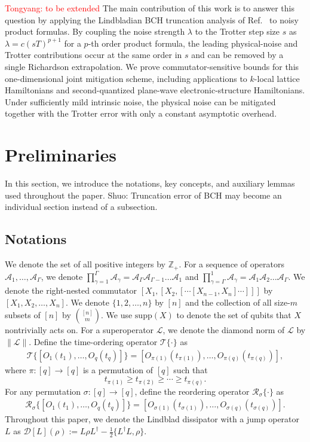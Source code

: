 \documentclass[aps,pra,reprint,groupedaddress,floatfix]{revtex4-2}
\newcommand{\A}{\mathcal{A}}
\newcommand{\supp}{\mathrm{supp}}
\newcommand{\mc}{\mathcal}
\newcommand{\mb}{\mathbb}
\newcommand{\sz}[1]{{\color{blue} Shuo: #1}}
\begin{document}
\textcolor{red}{Tongyang: to be extended}
The main contribution of this work is to answer this question by applying the Lindbladian BCH truncation analysis of Ref.~\cite{wang2026lindbladiansimulationcommutatorbounds} to noisy product formulas. By coupling the noise strength $\lambda$ to the Trotter step size $s$ as $\lambda = c(sT)^{p+1}$ for a $p$-th order product formula, the leading physical-noise and Trotter contributions occur at the same order in $s$ and can be removed by a single Richardson extrapolation. We prove commutator-sensitive bounds for this one-dimensional joint mitigation scheme, including applications to $k$-local lattice Hamiltonians and second-quantized plane-wave electronic-structure Hamiltonians. Under sufficiently mild intrinsic noise, the physical noise can be mitigated together with the Trotter error with only a constant asymptotic overhead.


\section{Preliminaries}
 In this section, we introduce the notations, key concepts, and auxiliary lemmas used throughout the paper. \sz{Truncation error of BCH may become an individual section instead of a subsection.}


\subsection{Notations}
We denote the set of all positive integers by $\mb{Z}_+$. For a sequence of operators $\A_1, \ldots, \A_{\Gamma}$, we denote $\prod_{\gamma=1}^\Gamma \A_{\gamma}= \A_{\Gamma}\A_{\Gamma-1} \ldots \A_1$ and $\prod_{\gamma=\Gamma}^1 \A_{\gamma}= \A_{1}\A_{2} \ldots \A_\Gamma$. We denote the right-nested commutator $[X_1, [X_2, [\cdots[X_{n-1}, X_n]\cdots]]]$ by $[X_1, X_2, \ldots, X_n]$. We denote $\{1, 2, \ldots, n\}$ by $[n]$ and the collection of all size-$m$ subsets of $[n]$ by $\binom{[n]}{m}$. We use $\supp(X)$ to denote the set of qubits that $X$ nontrivially acts on.  For a superoperator $\mc L$, we denote the diamond norm of $\mc L$ by $\|\mc L\|$.
Define the time-ordering operator $\mc T\{\cdot\}$ as \begin{align*}
    \mc T\big\{[O_1(t_1),\ldots, O_q(t_q) ]\big\}
    =
    [O_{\pi(1)}(t_{\pi(1)}),\ldots, O_{\pi(q)}(t_{\pi(q)})],
\end{align*}
where $\pi\colon [q]\to[q]$ is a permutation of $[q]$ such that \[
    t_{\pi(1)}\ge t_{\pi(2)}\ge \cdots \ge t_{\pi(q)}.
    \]
For any permutation $\sigma\colon [q]\to [q]$, define the reordering operator $\mc R_{\sigma}\{\cdot\}$ as \begin{align*}
    \mc R_{\sigma}\big\{[O_1(t_1),\ldots, O_q(t_q)]\big\}
    =
    [O_{\sigma(1)}(t_{\sigma(1)}),\ldots, O_{\sigma(q)}(t_{\sigma(q)})].
\end{align*}
Throughout this paper, we denote the Lindblad dissipator with a jump operator $L$ as $\mathcal{D}[L](\rho):= L\rho L^\dagger - \frac{1}{2}\{L^\dagger L, \rho\}$.
\end{document}
